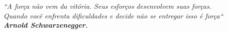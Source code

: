 \begin{epigrafe}
    \vspace*{\fill}
	\begin{flushright}
	\textit{``A força não vem da vitória. Seus esforços desenvolvem
		suas  forças. \\Quando você enfrenta dificuldades e decide não se entregar 
		isso é força`` \\
		\textbf{Arnold Schwarzenegger.}}
	\end{flushright}
\end{epigrafe}
